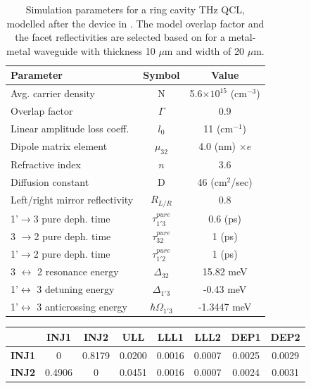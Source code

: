 \documentclass[10pt,letterpaper]{article}
\begin{document}
{\begin{appendices}
\begin{table}[H]
	\centering
	\footnotesize
	\begin{tabular}{ p{35 mm} c c}	
		\hline
		\textbf{Parameter}  & \textbf{Symbol} & \textbf{Value}\\
		\hline
		Avg. carrier density & N & 5.6$\times10^{15}$ (cm$^{-3}$)  \\
		Overlap factor & $\Gamma$ & 0.9 \\
		Linear amplitude loss coeff. & $l_0$ & 11 (cm$^{-1}$) \\
		Dipole matrix element &$\mu_{32}$& 4.0 (nm) $\times e$  \\
		Refractive index  & $n$ & 3.6 \\
		Diffusion constant & D & 46 (cm$^2$/sec)\\
		Left/right mirror reflectivity & $ R_{L/R} $ & 0.8 \\
		1'$\rightarrow$3 pure deph. time & $\tau_{1'3}^{pure}$ & 0.6 (ps)\\
		3 $\rightarrow$2 pure deph. time & $\tau_{32}^{pure}$ & 1 (ps)\\
		1'$\rightarrow$2 pure deph. time & $\tau_{1'2}^{pure}$ & 1 (ps)\\
		3 $\leftrightarrow$ 2 resonance energy & $ \Delta_{32}$ &  15.82 meV\\
		1'$\leftrightarrow$ 3 detuning energy & $\Delta_{1'3} $ &  -0.43 meV\\
		1'$\leftrightarrow$ 3 anticrossing energy & $\hbar\Omega_{1'3}$ &  -1.3447 meV\\
		\hline 
	\end{tabular}
	\caption[Table caption text]{ Simulation parameters for a ring cavity THz QCL, modelled after the device in \cite{burghoff2014terahertz}. The model overlap factor and the facet reflectivities are selected based on \cite{kohen2005electromagnetic} for a metal-metal waveguide with thickness 10 $\mu$m and width of 20 $\mu$m.}
	\label{tab:table01}
\end{table}
\begin{table}[H]
\centering
\footnotesize
\begin{tabular}{ r | c c c c c c c}	
\hline
& \textbf{INJ1}  & 	\textbf{INJ2}& 	\textbf{ULL} & 	\textbf{LLL1} & 	\textbf{LLL2} & 	\textbf{DEP1} & 	\textbf{DEP2}\\
\hline
\textbf{INJ1}  & 0 &    0.8179 &    0.0200  &   0.0016   &  0.0007  &   0.0025 &    0.0029 \\
\textbf{INJ2}  & 0.4906      &    0 &    0.0451  &   0.0016 &    0.0007  &   0.0024 &    0.0031 \\

\end{tabular}
\end{table}
\end{appendices}}
\end{document}
